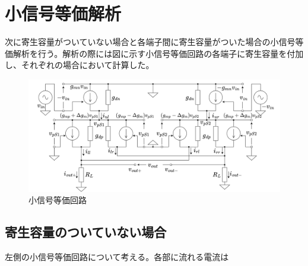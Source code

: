 
\section{小信号等価解析}
次に寄生容量がついていない場合と各端子間に寄生容量がついた場合の小信号等価解析を行う。解析の際には図に示す小信号等価回路の各端子に寄生容量を付加し、それぞれの場合において計算した。

\begin{figure}[!t]
    \centering
    \includegraphics*[width=140mm]{figures/FoldedGilbertBaseEquivalentCircuit.png}
    \caption{小信号等価回路}
    \label{fgi:base_equiv}
\end{figure}

\subsection{寄生容量のついていない場合}
    左側の小信号等価回路について考える。各部に流れる電流は

